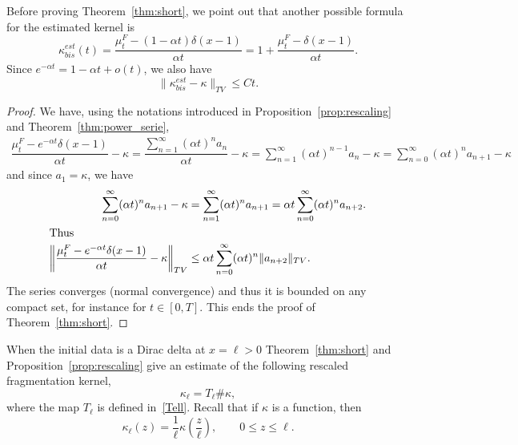\documentclass[10pt]{amsart}
\theoremstyle{definition}\newtheorem{defi}[theo]{Definition}\newtheorem{rema}[theo]{Remark}\newtheorem{exam}[theo]{Example}\newtheorem{exem}[theo]{Example}\newtheorem{nota}[theo]{Notation}
\renewcommand*\a{\alpha}
\begin{document}
Before proving Theorem~\ref{thm:short}, we point out that another possible formula for the estimated kernel is
\begin{equation*}
\kappa^{est}_{bis}(t)= \dfrac{\mu_t^{F} - (1-\alpha t)\delta(x-1) }{\a t}= 1 +\dfrac{\mu_t^{F} - \delta(x-1) }{\a t}.
\end{equation*}
Since $e^{-\alpha t} =1 - \alpha t +o(t)$, we also have
\begin{equation*}
\Big\|\kappa_{bis}^{est}-\kappa\Big\|_{TV} \leq C t.
\end{equation*}
\begin{proof}
We have, using the notations introduced in Proposition~\ref{prop:rescaling} and Theorem~\ref{thm:power_serie},
\begin{equation*}
\begin{aligned}
\dfrac{\mu_t^{F} -e^{-\a t} \delta(x-1)}{\a t} -\kappa = \dfrac{\sum\limits_{n=1}^{\infty} (\a t)^{n} a_n }{\a t}- \kappa = \sum\limits_{n=1}^{\infty} (\a t)^{n-1} a_{n} -\kappa = \sum\limits_{n=0}^{\infty} (\a t)^n a_{n+1} -\kappa
\end{aligned}
\end{equation*}
and since $a_1= \kappa$, we have
\begin{align*}
\sum\limits_{n=0}^{\infty} (\a t)^n a_{n+1} -\kappa &= \sum\limits_{n=1}^{\infty} (\a t)^n a_{n+1} =
\a t \sum\limits_{n=0}^{\infty} (\a t)^n a_{n+2}.\\
\intertext{Thus}
\left\| \dfrac{\mu_t^{F} -e^{-\a t} \delta(x-1)}{\a t} -\kappa \right\|_{TV}
&\leq \a t \sum\limits_{n=0}^{\infty}(\a t)^n \|a_{n+2}\|_{TV}.
\end{align*}
The series converges (normal convergence) and thus it is bounded on any compact set, for instance for $t\in [0,T]$. This ends the proof of Theorem~\ref{thm:short}.
\end{proof}
When the initial data is a Dirac delta at $x=\ell>0$ Theorem~\ref{thm:short} and Proposition~\ref{prop:rescaling} give an estimate of the following rescaled fragmentation kernel,
\begin{equation*}
\kappa_{\ell} = T_{\ell} \#\kappa,
\end{equation*}
where the map $T_{\ell}$ is defined in~\eqref{Tell}. Recall that if $\kappa$ is a function, then
\begin{equation*}
\kappa_{\ell} (z) = \dfrac{1}{\ell}\kappa\left(\dfrac{z}{\ell}\right), \qquad 0\leq z\leq \ell.
\end{equation*}
\end{document}
